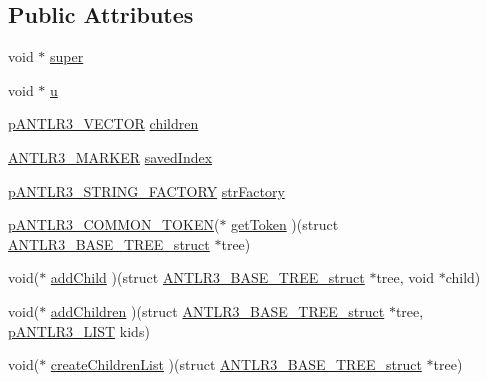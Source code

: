 \subsection*{Public Attributes}
\begin{DoxyCompactItemize}
\item 
void $\ast$ \hyperlink{struct_a_n_t_l_r3___b_a_s_e___t_r_e_e__struct_abd20044da7f517e47aaa0b65d28d9b64}{super}
\item 
void $\ast$ \hyperlink{struct_a_n_t_l_r3___b_a_s_e___t_r_e_e__struct_a72f24e689b5faf745271636b43207d0b}{u}
\item 
\hyperlink{antlr3interfaces_8h_a0dfeeada7529fbe1b968be84079b828f}{p\-A\-N\-T\-L\-R3\-\_\-\-V\-E\-C\-T\-O\-R} \hyperlink{struct_a_n_t_l_r3___b_a_s_e___t_r_e_e__struct_a323bddeaa8cb3a8bb98423f9b2b5a013}{children}
\item 
\hyperlink{antlr3defs_8h_a0361e6bf442e07afe923e4d05e9ebc4f}{A\-N\-T\-L\-R3\-\_\-\-M\-A\-R\-K\-E\-R} \hyperlink{struct_a_n_t_l_r3___b_a_s_e___t_r_e_e__struct_a8bd4e72792509a3c53a0178d3e4bf865}{saved\-Index}
\item 
\hyperlink{antlr3interfaces_8h_a499a87287d582de04cf736f342b20692}{p\-A\-N\-T\-L\-R3\-\_\-\-S\-T\-R\-I\-N\-G\-\_\-\-F\-A\-C\-T\-O\-R\-Y} \hyperlink{struct_a_n_t_l_r3___b_a_s_e___t_r_e_e__struct_aacf6a3d7f5230c88eee3bc601deacf27}{str\-Factory}
\item 
\hyperlink{antlr3interfaces_8h_adaa6df9cbf0cd7ab37fd545520ff299b}{p\-A\-N\-T\-L\-R3\-\_\-\-C\-O\-M\-M\-O\-N\-\_\-\-T\-O\-K\-E\-N}($\ast$ \hyperlink{struct_a_n_t_l_r3___b_a_s_e___t_r_e_e__struct_a63c1394d11e3a69a3be1c33f2b17df31}{get\-Token} )(struct \hyperlink{struct_a_n_t_l_r3___b_a_s_e___t_r_e_e__struct}{A\-N\-T\-L\-R3\-\_\-\-B\-A\-S\-E\-\_\-\-T\-R\-E\-E\-\_\-struct} $\ast$tree)
\item 
void($\ast$ \hyperlink{struct_a_n_t_l_r3___b_a_s_e___t_r_e_e__struct_ae1dac66500c29730b5514b874ebf3ddf}{add\-Child} )(struct \hyperlink{struct_a_n_t_l_r3___b_a_s_e___t_r_e_e__struct}{A\-N\-T\-L\-R3\-\_\-\-B\-A\-S\-E\-\_\-\-T\-R\-E\-E\-\_\-struct} $\ast$tree, void $\ast$child)
\item 
void($\ast$ \hyperlink{struct_a_n_t_l_r3___b_a_s_e___t_r_e_e__struct_a6dd0ae2aa94691566e5c2a5fcc30deab}{add\-Children} )(struct \hyperlink{struct_a_n_t_l_r3___b_a_s_e___t_r_e_e__struct}{A\-N\-T\-L\-R3\-\_\-\-B\-A\-S\-E\-\_\-\-T\-R\-E\-E\-\_\-struct} $\ast$tree, \hyperlink{antlr3interfaces_8h_ae2fcb7565c1f2a85d99e61299f33fbf1}{p\-A\-N\-T\-L\-R3\-\_\-\-L\-I\-S\-T} kids)
\item 
void($\ast$ \hyperlink{struct_a_n_t_l_r3___b_a_s_e___t_r_e_e__struct_a1f91471ff08c7024354d1af5f024df8c}{create\-Children\-List} )(struct \hyperlink{struct_a_n_t_l_r3___b_a_s_e___t_r_e_e__struct}{A\-N\-T\-L\-R3\-\_\-\-B\-A\-S\-E\-\_\-\-T\-R\-E\-E\-\_\-struct} $\ast$tree)

\end{DoxyCompactItemize}
